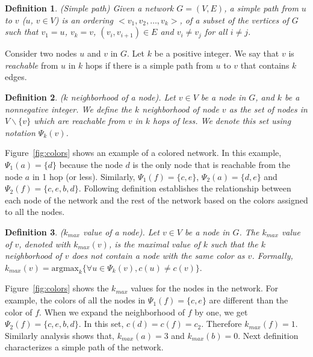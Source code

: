 \documentclass{ws-procs11x85}
\newtheorem{define}{Definition}
\begin{document}
\begin{define} {\sc (Simple path)}
  Given a network $G=(V,E)$, a {\em simple path} from $u$ to $v$ ($u$,
  $v \in V$) is an ordering $<v_{1},v_{2}, \dots,v_{k}>$, of a subset
  of the vertices of $G$ such that $v_{1}=u$, $v_{k}=v$,
  $(v_{i},v_{i+1}) \in E$ and $v_i \neq v_j$ for all $i \neq j$.
\end{define}

Consider two nodes $u$ and $v$ in $G$. Let $k$ be a positive integer.
We say that $v$ is {\em reachable} from $u$ in $k$ hops if there is a
simple path from $u$ to $v$ that contains $k$ edges.

\begin{define}
  {\sc ($k$ neighborhood of a node)}. Let $v \in V$ be a node in $G$,
  and $k$ be a nonnegative integer.  We define the $k$ neighborhood of
  node $v$ as the set of nodes in $V \backslash \{v\}$ which are
  reachable from $v$ in $k$ hops of less. We denote this set using
  notation $\Psi_k(v)$.
\end{define}

Figure~\ref{fig:colors} shows an example of a colored network.  In
this example, $\Psi_1(a) = \{d\}$ because the node $d$ is the only
node that is reachable from the node $a$ in 1 hop (or less).
Similarly, $\Psi_1(f) = \{c, e\}$, $\Psi_2(a) = \{d, e\}$ and
$\Psi_2(f) = \{c, e, b, d\}$.  Following definition establishes the
relationship between each node of the network and the rest of the
network based on the colors assigned to all the nodes.

\begin{define}
  {\sc ($k_{max}$ value of a node)}. Let $v \in V$ be a node in $G$.
  The $k_{max}$ value of $v$, denoted with $k_{max}(v)$, is the
  maximal value of $k$ such that the $k$ neighborhood of $v$ does not
  contain a node with the same color as $v$. Formally, $ k_{max}(v) =
  \textrm{argmax}_k \{ \forall u \in \Psi_k(v), c(u) \neq c(v) \}.  $
\label{dfn:kmax:node}
\end{define}

Figure~\ref{fig:colors} shows the $k_{max}$ values for the nodes in
the network. For example, the colors of all the nodes in $\Psi_1(f) =
\{c, e\}$ are different than the color of $f$. When we expand the
neighborhood of $f$ by one, we get $\Psi_2(f) = \{c, e, b, d\}$. In
this set, $c(d) = c(f) = c_2$.  Therefore $k_{max}(f) = 1$.  Similarly
analysis shows that, $k_{max}(a) = 3$ and $k_{max}(b) = 0$. Next
definition characterizes a simple path of the network.
\end{document}
